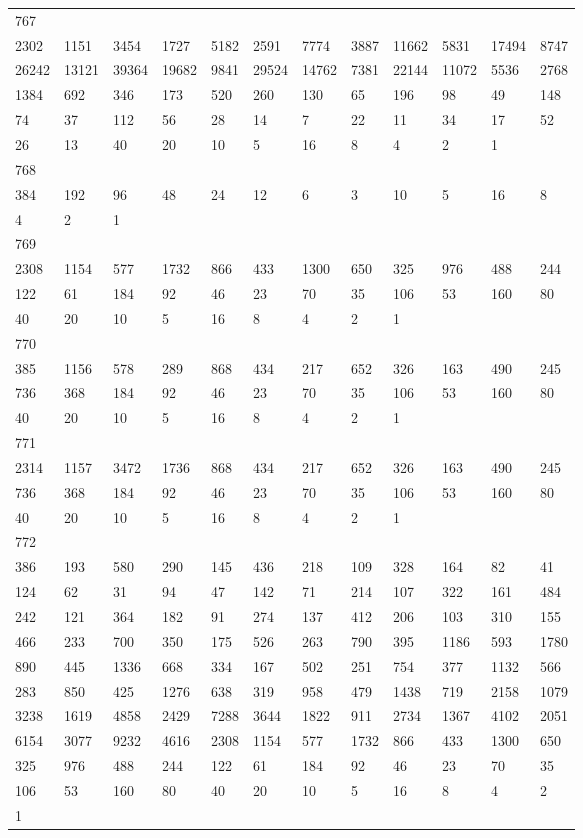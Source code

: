\begin{longtable}{llllllllllll}
767&&&&&&&&&&&\\
2302& 1151& 3454& 1727& 5182& 2591& 7774& 3887& 11662& 5831& 17494& 8747\\
26242& 13121& 39364& 19682& 9841& 29524& 14762& 7381& 22144& 11072& 5536& 2768\\
1384& 692& 346& 173& 520& 260& 130& 65& 196& 98& 49& 148\\
74& 37& 112& 56& 28& 14& 7& 22& 11& 34& 17& 52\\
26& 13& 40& 20& 10& 5& 16& 8& 4& 2& 1& \\

768&&&&&&&&&&&\\
384& 192& 96& 48& 24& 12& 6& 3& 10& 5& 16& 8\\
4& 2& 1& \\

769&&&&&&&&&&&\\
2308& 1154& 577& 1732& 866& 433& 1300& 650& 325& 976& 488& 244\\
122& 61& 184& 92& 46& 23& 70& 35& 106& 53& 160& 80\\
40& 20& 10& 5& 16& 8& 4& 2& 1& \\

770&&&&&&&&&&&\\
385& 1156& 578& 289& 868& 434& 217& 652& 326& 163& 490& 245\\
736& 368& 184& 92& 46& 23& 70& 35& 106& 53& 160& 80\\
40& 20& 10& 5& 16& 8& 4& 2& 1& \\

771&&&&&&&&&&&\\
2314& 1157& 3472& 1736& 868& 434& 217& 652& 326& 163& 490& 245\\
736& 368& 184& 92& 46& 23& 70& 35& 106& 53& 160& 80\\
40& 20& 10& 5& 16& 8& 4& 2& 1& \\

772&&&&&&&&&&&\\
386& 193& 580& 290& 145& 436& 218& 109& 328& 164& 82& 41\\
124& 62& 31& 94& 47& 142& 71& 214& 107& 322& 161& 484\\
242& 121& 364& 182& 91& 274& 137& 412& 206& 103& 310& 155\\
466& 233& 700& 350& 175& 526& 263& 790& 395& 1186& 593& 1780\\
890& 445& 1336& 668& 334& 167& 502& 251& 754& 377& 1132& 566\\
283& 850& 425& 1276& 638& 319& 958& 479& 1438& 719& 2158& 1079\\
3238& 1619& 4858& 2429& 7288& 3644& 1822& 911& 2734& 1367& 4102& 2051\\
6154& 3077& 9232& 4616& 2308& 1154& 577& 1732& 866& 433& 1300& 650\\
325& 976& 488& 244& 122& 61& 184& 92& 46& 23& 70& 35\\
106& 53& 160& 80& 40& 20& 10& 5& 16& 8& 4& 2\\
1& \\


\end{longtable}
